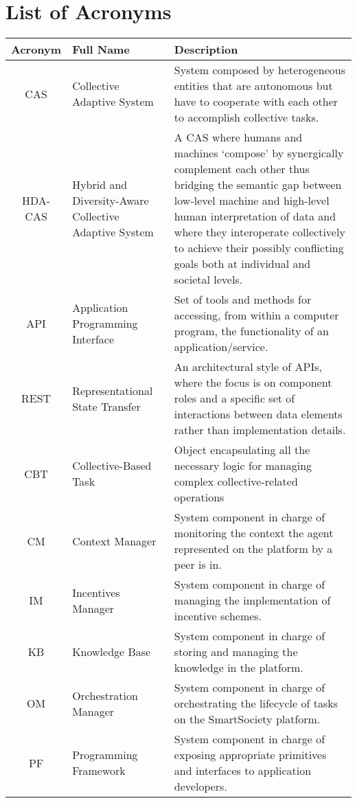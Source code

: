 \documentclass{SmartReport}
\begin{document}
\section*{List of Acronyms}
\begin{tabular}{|c|p{3cm}|p{10cm}|}
\hline 
\textbf{Acronym} & \textbf{Full Name} & \textbf{Description} \\
\hline 
\hline 
CAS & Collective Adaptive System & System composed by heterogeneous entities that are autonomous but have to cooperate with each other to accomplish collective tasks.\\ \hline
HDA-CAS & Hybrid and Diversity-Aware Collective Adaptive System & A CAS where humans and machines `compose' by synergically complement each other thus bridging the semantic gap between low-level machine and high-level human interpretation of data and where they interoperate collectively to achieve their possibly conflicting goals both at individual and societal levels.\\ \hline
API & Application Programming Interface & Set of tools and methods for accessing, from within a computer program, the functionality of an application/service. \\ \hline
REST & Representational State Transfer & An architectural style of APIs, where the focus is on component roles and a specific set of interactions between data elements rather than implementation details.\\ \hline
CBT & Collective-Based Task & Object encapsulating all the necessary logic for managing complex collective-related operations \\ \hline 
CM & Context Manager & System component in charge of monitoring the
context the agent represented on the platform by a peer is in.\\
\hline
IM & Incentives Manager & System component in charge of managing the implementation of incentive schemes.\\  
\hline 
KB & Knowledge Base &  System component in charge of storing and managing the knowledge in the platform.\\
\hline
OM & Orchestration Manager &  System component in charge of
orchestrating the lifecycle of tasks on the SmartSociety platform. \\
\hline 
PF & Programming Framework &  System component in charge of exposing
appropriate primitives and interfaces to application developers.\\

\end{tabular}
\end{document}
